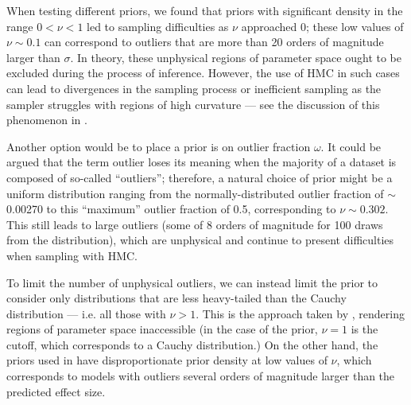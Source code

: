 \documentclass[fleqn,usenatbib]{rasti}
\begin{document}

When testing different priors, we found that priors with significant density in
the range $0 < \nu < 1$ led to sampling difficulties as $\nu$ approached 0;
these low values of $\nu \sim 0.1$ can correspond to outliers that are more than
20 orders of magnitude larger than $\sigma$. In theory, these unphysical regions
of parameter space ought to be excluded during the process of inference.
However, the use of HMC in such cases can lead to divergences in the sampling
process or inefficient sampling as the sampler struggles with regions of high
curvature --- see the discussion of this phenomenon in \citet{Neal:2003}.

Another option would be to place a prior is on outlier fraction $\omega$. It
could be argued that the term outlier loses its meaning when the majority of a
dataset is composed of so-called ``outliers''; therefore, a natural choice of
prior might be a uniform distribution ranging from the normally-distributed
outlier fraction of $\sim$0.00270 to this ``maximum'' outlier fraction of 0.5,
corresponding to $\nu \sim 0.302$. This still leads to large outliers (some of 8
orders of magnitude for 100 draws from the distribution), which are unphysical
and continue to present difficulties when sampling with HMC.

To limit the number of unphysical outliers, we can instead limit the prior to
consider only distributions that are less heavy-tailed than the Cauchy
distribution --- i.e. all those with $\nu > 1$. This is the approach taken by
\citet{Gelman:2013}, rendering regions of parameter space inaccessible (in the
case of the \citet{Gelman:2013} prior, $\nu = 1$ is the cutoff, which
corresponds to a Cauchy distribution.) On the other hand, the priors used in
\citet{Juarez:2010, Ding:2014, Feeney:2018} have disproportionate prior density
at low values of $\nu$, which corresponds to models with outliers several orders
of magnitude larger than the predicted effect size.
\end{document}
